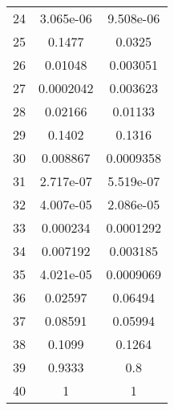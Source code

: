 \begin{table}[h!]
\begin{tabular}{||c|c|c||}
    24           & 3.065e-06           & 9.508e-06           \\
    25           & 0.1477              & 0.0325              \\
    26           & 0.01048             & 0.003051            \\
    27           & 0.0002042           & 0.003623            \\
    28           & 0.02166             & 0.01133             \\
    29           & 0.1402              & 0.1316              \\
    30           & 0.008867            & 0.0009358           \\
    31           & 2.717e-07           & 5.519e-07           \\
    32           & 4.007e-05           & 2.086e-05           \\
    33           & 0.000234            & 0.0001292           \\
    34           & 0.007192            & 0.003185            \\
    35           & 4.021e-05           & 0.0009069           \\
    36           & 0.02597             & 0.06494             \\
    37           & 0.08591             & 0.05994             \\
    38           & 0.1099              & 0.1264              \\
    39           & 0.9333              & 0.8                 \\
    40           & 1                   & 1                   \\
    \bottomrule
  \end{tabular}
  \label{tab:stat_tests}
\end{table}



